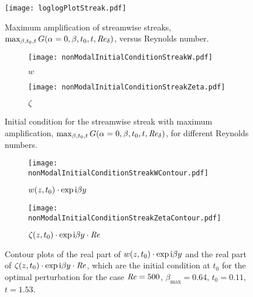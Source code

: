 \documentclass{jfm}
\newcommand\Rey{\mbox{\textit{Re}}}  %
\begin{document}
\begin{figure}
  \centering
    \texttt{[image: loglogPlotStreak.pdf]}
    \caption{Maximum amplification of streamwise streaks, $ \max_{\beta,t_0,t} G(\alpha=0,\beta,t_0,t,\Rey_\delta) $, versus Reynolds number.}
    \label{fig:loglogPlot}
\end{figure}

\begin{figure}
  \centering
  \begin{subfigure}[b]{0.5\textwidth}
    \texttt{[image: nonModalInitialConditionStreakW.pdf]}
    \caption{ $ w $ }
    \label{fig:contourB}
  \end{subfigure} \nolinebreak
  \begin{subfigure}[b]{0.5\textwidth}
    \texttt{[image: nonModalInitialConditionStreakZeta.pdf]}
    \caption{ $ \zeta $ }
    \label{fig:contourC}
  \end{subfigure} 
  \caption{Initial condition for the streamwise streak with maximum amplification,
    $ \max_{\beta,t_0,t} G(\alpha=0,\beta,t_0,t,\Rey_\delta) $, for
    different Reynolds numbers.}
  \label{fig:initialConditionStreak}
\end{figure}

\begin{figure}
  \centering
  \begin{subfigure}[b]{0.5\textwidth}
    \texttt{[image: nonModalInitialConditionStreakWContour.pdf]}
    \caption{ $ w(z,t_0) \cdot \exp {\rm i} \beta y $ }
    \label{fig:contourB}
  \end{subfigure} \nolinebreak
  \begin{subfigure}[b]{0.5\textwidth}
    \texttt{[image: nonModalInitialConditionStreakZetaContour.pdf]}
    \caption{ $ \zeta(z,t_0) \cdot \exp {\rm i} \beta y \cdot \Rey $ }
    \label{fig:contourC}
  \end{subfigure} 
  \caption{Contour plots of the real part of $ w(z,t_0) \cdot \exp {\rm i} \beta y $
    and the real part of $ \zeta(z,t_0) \cdot \exp {\rm i} \beta y \cdot \Rey $,
    which are the initial condition at $ t_0 $
    for the optimal perturbation for the case $ \Rey = 500 $, $ \beta_{\max} = 0.64 $, $ t_0 = 0.11 $, $ t = 1.53 $.}
  \label{fig:initialConditionStreakContour}
\end{figure}
\end{document}
